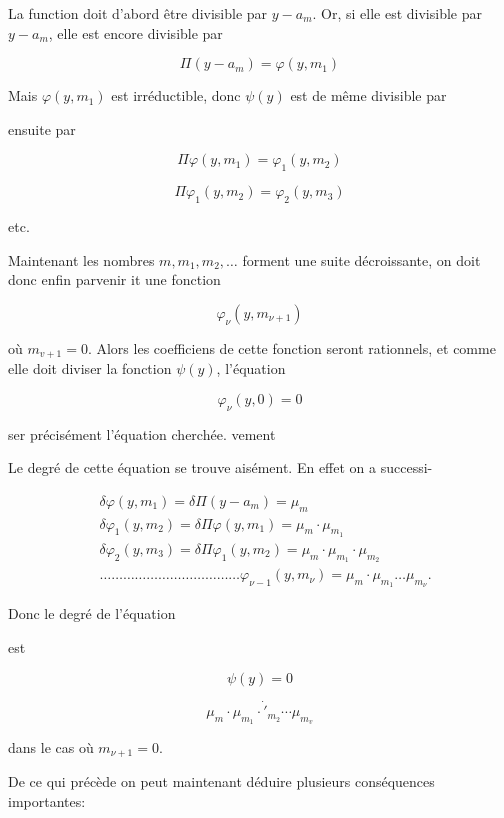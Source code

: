 \documentclass{article}
\begin{document}
La function doit d'abord être divisible par \(y-a_{m}\). Or, si elle est divisible par \(y-a_{m}\), elle est encore divisible par

\[
\Pi\left(y-a_{m}\right)=\varphi\left(y, m_{1}\right)
\]

Mais \(\varphi\left(y, m_{1}\right)\) est irréductible, donc \(\psi(y)\) est de même divisible par

ensuite par

\[
\Pi \varphi\left(y, m_{1}\right)=\varphi_{1}\left(y, m_{2}\right)
\]

\[
\Pi \varphi_{1}\left(y, m_{2}\right)=\varphi_{2}\left(y, m_{3}\right)
\]

etc.

Maintenant les nombres \(m, m_{1}, m_{2}, \ldots\) forment une suite décroissante, on doit donc enfin parvenir it une fonction

\[
\varphi_{\nu}\left(y, m_{\nu+1}\right)
\]

où \(m_{v+1}=0\). Alors les coefficiens de cette fonction seront rationnels, et comme elle doit diviser la fonction \(\psi(y)\), l'équation

\[
\varphi_{\nu}(y, 0)=0
\]

ser précisément l'équation cherchée. vement

Le degré de cette équation se trouve aisément. En effet on a successi-

\[
\begin{aligned}
& \delta \varphi\left(y, m_{1}\right)=\delta \Pi\left(y-a_{m}\right)=\mu_{m} \\
& \delta \varphi_{1}\left(y, m_{2}\right)=\delta \Pi \varphi\left(y, m_{1}\right)=\mu_{m} \cdot \mu_{m_{1}} \\
& \delta \varphi_{2}\left(y, m_{3}\right)=\delta \Pi \varphi_{1}\left(y, m_{2}\right)=\mu_{m} \cdot \mu_{m_{1}} \cdot \mu_{m_{2}} \\
& \ldots \ldots \ldots \ldots \ldots \ldots \ldots \ldots \ldots \ldots \ldots \ldots \varphi_{\nu-1}\left(y, m_{\nu}\right)=\mu_{m} \cdot \mu_{m_{1}} \ldots \mu_{m_{\nu}} .
\end{aligned}
\]

Donc le degré de l'équation

est

\[
\psi(y)=0
\]

\[
\mu_{m} \cdot \mu_{m_{1}} \cdot \dot{\prime}_{m_{2}} \cdots \mu_{m_{v}}
\]

dans le cas où \(m_{\nu+1}=0\).

De ce qui précède on peut maintenant déduire plusieurs conséquences importantes:
\end{document}
